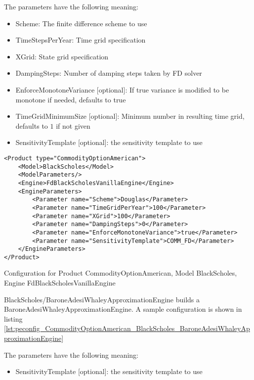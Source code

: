 The parameters have the following meaning:

\begin{itemize}
\item Scheme: The finite difference scheme to use
\item TimeStepsPerYear: Time grid specification
\item XGrid: State grid specification
\item DampingSteps: Number of damping steps taken by FD solver
\item EnforceMonotoneVariance [optional]: If true variance is modified to be monotone if needed, defaults to true
\item TimeGridMinimumSize [optional]: Minimum number in resulting time grid, defaults to $1$ if not given
\item SensitivityTemplate [optional]: the sensitivity template to use 
\end{itemize}

\begin{longlisting}
\begin{verbatim}
<Product type="CommodityOptionAmerican">
    <Model>BlackScholes</Model>
    <ModelParameters/>
    <Engine>FdBlackScholesVanillaEngine</Engine>
    <EngineParameters>
        <Parameter name="Scheme">Douglas</Parameter>
        <Parameter name="TimeGridPerYear">100</Parameter>
        <Parameter name="XGrid">100</Parameter>
        <Parameter name="DampingSteps">0</Parameter>
        <Parameter name="EnforceMonotoneVariance">true</Parameter>
        <Parameter name="SensitivityTemplate">COMM_FD</Parameter>
    </EngineParameters>
</Product>
\end{verbatim}
\caption{Configuration for Product CommodityOptionAmerican, Model BlackScholes, Engine FdBlackScholesVanillaEngine}
\label{lst:peconfig_CommodityOptionAmerican_BlackScholes_FdBlackScholesVanillaEngine}
\end{longlisting}

BlackScholes/BaroneAdesiWhaleyApproximationEngine builds a BaroneAdesiWhaleyApproximationEngine. A sample configuration is shown in listing
\ref{lst:peconfig_CommodityOptionAmerican_BlackScholes_BaroneAdesiWhaleyApproximationEngine}

The parameters have the following meaning:

\begin{itemize}
\item SensitivityTemplate [optional]: the sensitivity template to use 
\end{itemize}

